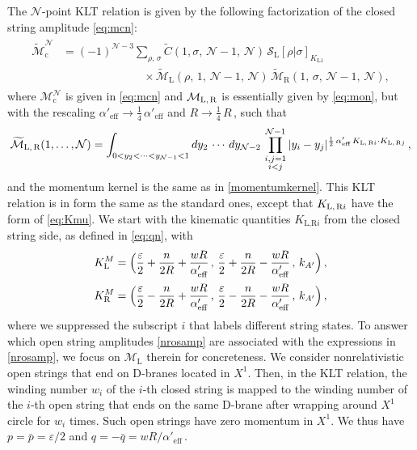 \documentclass[11pt]{article}
\newcommand{\be}{\begin{equation}}
\newcommand{\ee}{\end{equation}}
\newcommand{\CN}{\mathcal{N}}
\newcommand{\CM}{\mathcal{M}}
\newcommand{\lr}{\left (}
\newcommand{\rr}{\right )}
\renewcommand{\tilde}[1]{\widetilde{#1}}
\begin{document}
The $\CN$-point KLT relation is given by 
%
the following factorization of the closed string amplitude \eqref{eq:mcn}:
%
\begin{align} \label{eq:nrklt}
\begin{split}
    \tilde{\CM}_\text{c}^\CN & = (-1)^{\CN-3} \sum_{\rho,\,\sigma} \tilde{C}(1, \sigma, \, \CN-1, \, \CN) \, \mathcal{S}_\text{L} [\rho|\sigma]^{}_{K_{\text{L}1}} \\[-4pt]
    & \hspace{3cm} \times \tilde{\CM}_\text{L} \lr \rho, \,1, \, \CN-1, \, \CN \rr \, \tilde{\CM}_\text{R} \lr 1, \, \sigma, \, \CN-1, \, \CN \rr,
\end{split}
\end{align}
%
where $\CM_\text{c}^\CN$ is given in \eqref{eq:mcn} and $\CM_\text{L,\,R}$ is essentially given by \eqref{eq:mon}, but with the rescaling $\alpha'_\text{eff} \rightarrow \frac{1}{4} \, \alpha'_\text{eff}$ and $R \rightarrow \frac{1}{4} \, R$\,, such that
%
\be \label{nrosamp}
    \tilde{\CM}_\text{L,\,R} (1, \dots, \CN) = \int_{0 < y_2 < \cdots < y_{\CN-1} < 1} dy_2 \, \cdots \, dy_{\CN-2}\, \prod_{\substack{i,j = 1\\i<j}}^{\CN-1} |y_{i} - y_{j}|^{\frac{1}{2} \, \alpha'_\text{eff} \, K_{\text{L,\,R}i} \cdot K_{\text{L,\,R}j}}\,,
\ee
%
and the momentum kernel is the same as in \eqref{momentumkernel}. This KLT relation is in form the same as the standard ones, except that $K_{\text{L,\,R}i}$ have the form of \eqref{eq:Kmu}. We start with the kinematic quantities $K_{\text{L,R}i}$ from the closed string side, as defined in \eqref{eq:qn}, with
%
\begin{subequations}\label{eq:closedMomenta}
\begin{align}
    K^{M}_{\text{L}} & = \Bigl( \frac{\varepsilon}{2} + \frac{n}{2R} + \frac{w R}{\alpha'_\text{eff}}\,, \, \frac{\varepsilon}{2} + \frac{n}{2R} - \frac{w R}{\alpha'_\text{eff}}\,, \, k_{A'} \Bigr)\,, \label{eq:KL} \\[2pt]
    K^{M}_{\text{R}} & = \Bigl( \frac{\varepsilon}{2} - \frac{n}{2R} + \frac{w R}{\alpha'_\text{eff}}\,, \, \frac{\varepsilon}{2} - \frac{n}{2R} - \frac{w R}{\alpha'_\text{eff}}\,, \, k_{A'} \Bigr)\,, \label{eq:KR}
\end{align}
\end{subequations}
%
where we suppressed the subscript $i$ that labels different string states.
To answer which open string amplitudes \eqref{nrosamp} are associated with the expressions in \eqref{nrosamp}, we focus on $\CM_\text{L}$ therein for concreteness. We consider nonrelativistic open strings that end on D-branes located in $X^1$. Then, in the KLT relation, the winding number $w_i$ of the $i$-th closed string is mapped to the winding number of the $i$-th open string that ends on the same D-brane after wrapping around $X^1$ circle for $w_i$ times. Such open strings have zero momentum in $X^1$. We thus have $p = \bar{p} = \varepsilon / 2$ and $q = - \bar{q} = wR / \alpha'_\text{eff}$\,.
\end{document}
